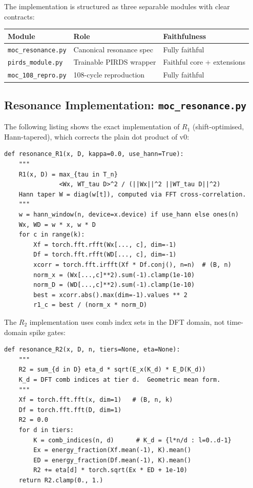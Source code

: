 \documentclass[11pt,a4paper]{article}
\theoremstyle{plain}
\theoremstyle{definition}
\theoremstyle{remark}
\begin{document}
The implementation is structured as three separable modules with clear contracts:

\begin{center}
\begin{tabular}{lll}
  \toprule
  Module & Role & Faithfulness \\
  \midrule
  \texttt{moc\_resonance.py} & Canonical resonance spec & Fully faithful \\
  \texttt{pirds\_module.py} & Trainable PIRDS wrapper & Faithful core + extensions \\
  \texttt{moc\_108\_repro.py} & 108-cycle reproduction & Fully faithful \\
  \bottomrule
\end{tabular}
\end{center}

\subsection{Resonance Implementation: \texttt{moc\_resonance.py}}

The following listing shows the exact implementation of $R_1$ (shift-optimised,
Hann-tapered), which corrects the plain dot product of v0:

\begin{lstlisting}[caption={$R_1$: shift-optimised Hann-tapered cross-correlation},label=lst:r1]
def resonance_R1(x, D, kappa=0.0, use_hann=True):
    """
    R1(x, D) = max_{tau in T_n}
               <Wx, WT_tau D>^2 / (||Wx||^2 ||WT_tau D||^2)
    Hann taper W = diag(w[t]), computed via FFT cross-correlation.
    """
    w = hann_window(n, device=x.device) if use_hann else ones(n)
    Wx, WD = w * x, w * D
    for c in range(k):
        Xf = torch.fft.rfft(Wx[..., c], dim=-1)
        Df = torch.fft.rfft(WD[..., c], dim=-1)
        xcorr = torch.fft.irfft(Xf * Df.conj(), n=n)  # (B, n)
        norm_x = (Wx[...,c]**2).sum(-1).clamp(1e-10)
        norm_D = (WD[...,c]**2).sum(-1).clamp(1e-10)
        best = xcorr.abs().max(dim=-1).values ** 2
        r1_c = best / (norm_x * norm_D)
\end{lstlisting}

The $R_2$ implementation uses comb index sets in the DFT domain, not time-domain
spike gates:

\begin{lstlisting}[caption={$R_2$: CRT comb energy fraction, geometric mean},label=lst:r2]
def resonance_R2(x, D, n, tiers=None, eta=None):
    """
    R2 = sum_{d in D} eta_d * sqrt(E_x(K_d) * E_D(K_d))
    K_d = DFT comb indices at tier d.  Geometric mean form.
    """
    Xf = torch.fft.fft(x, dim=1)   # (B, n, k)
    Df = torch.fft.fft(D, dim=1)
    R2 = 0.0
    for d in tiers:
        K = comb_indices(n, d)      # K_d = {l*n/d : l=0..d-1}
        Ex = energy_fraction(Xf.mean(-1), K).mean()
        ED = energy_fraction(Df.mean(-1), K).mean()
        R2 += eta[d] * torch.sqrt(Ex * ED + 1e-10)
    return R2.clamp(0., 1.)
\end{lstlisting}
\end{document}
